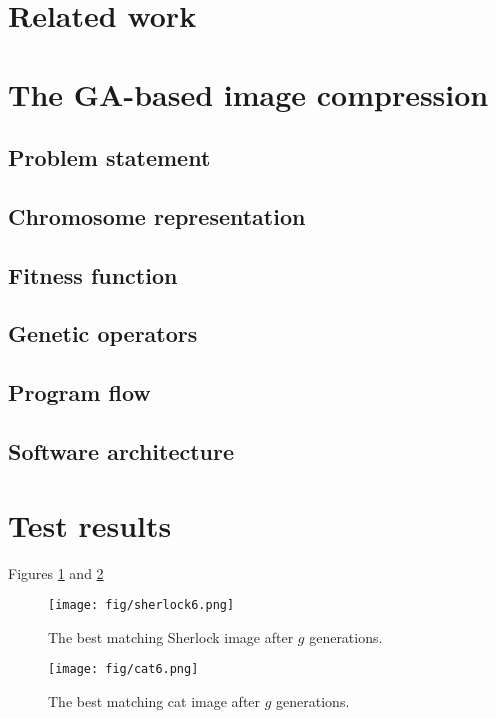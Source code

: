 \documentclass[conference]{IEEEtran}
\begin{document}
\section{Related work}


\section{The GA-based image compression}

\subsection{Problem statement}


\subsection{Chromosome representation}


\subsection{Fitness function}


\subsection{Genetic operators}


\subsection{Program flow}


\subsection{Software architecture}


\section{Test results}

Figures \ref{sherlock-6} and \ref{cat-6} 

\begin{figure}[htbp]
	\centering
	\texttt{[image: fig/sherlock6.png]}
	\caption{The best matching Sherlock image after $g$ generations.}
	\label{sherlock-6}
\end{figure}

\begin{figure}[htbp]
	\centering
	\texttt{[image: fig/cat6.png]}
	\caption{The best matching cat image after $g$ generations.}
	\label{cat-6}
\end{figure}
\end{document}
